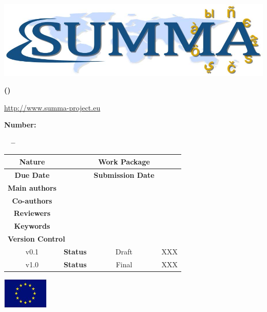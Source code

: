 
\pagestyle{fancy}
\chead{}
\lfoot{}
\rfoot{}\rhead{\DeliverableNumber\ \DeliverableName}
\setlength{\headheight}{16pt}
\renewcommand{\headrulewidth}{2.0pt}
\renewcommand{\footrulewidth}{2.0pt}

\renewcommand\arraystretch{1.1}


	\hfill
	\centerline{\includegraphics[width=\textwidth]{./images/SummaLogoFinal.jpg}}

	\bigskip
	\begin{center}
	\textbf{\LARGE\sffamily \ProjectTitle}
	
	\smallskip
	\textbf{\LARGE\sffamily(\ProjectAcronym)}
	
	\smallskip
	{\large \url{http://www.summa-project.eu}}

	\bigskip
	\textbf{\Large {\FundingScheme}}

	\smallskip
	\textbf{\Large Number: \GrantNo}

	\smallskip
	\textbf{\Large \DeliverableNumber ~ -- ~\DeliverableName}

	\end{center}


	\bigskip
	\begin{center}
	\begin{tabular}{|c|c|c|m{5.0cm}|}
	\hline
	\textbf{Nature} & \DeliverableNature & \textbf{Work Package} & \Workpackage \\ \hline

	\textbf{Due Date}  &  \DeliverableDueDate & \textbf{Submission Date}  & \DeliverableSubmissionDate \\ \hline

	\textbf{Main authors}  & \multicolumn{3}{|l|}{\MainAuthor} \\ \hline

	\textbf{Co-authors} & \multicolumn{3}{|p{120mm}|}{\CoAuthors} \\ \hline

	\textbf{Reviewers}  & \multicolumn{3}{|l|}{\Reviewers}  \\ \hline
 
	\textbf{Keywords}  & \multicolumn{3}{|l|}{\Keywords}\\ \hline
	
	\multicolumn{4}{|l|}{\textbf{Version Control}}\\ \hline
	
	v0.1 & \textbf{Status} & Draft & XXX \\ \hline
    v1.0 & \textbf{Status} & Final & XXX \\ \hline
\end{tabular}
	\end{center}


\vfill
\centerline{\includegraphics[height=1.5cm]{./images/EU_flag.jpg}}
\clearpage
